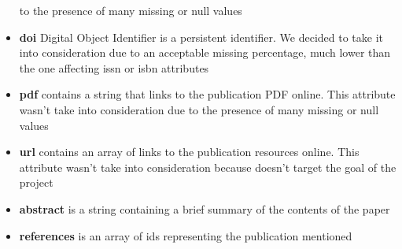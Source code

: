 \documentclass{Configuration_Files/PoliMi3i_thesis}
\begin{document}
\begin{itemize}
            to the presence of many missing or null values
    \item \textbf{doi} Digital Object Identifier is a persistent identifier. We decided to take it into consideration
            due to an acceptable missing percentage, much lower than the one affecting issn or isbn attributes
    \item \textbf{pdf} contains a string that links to the publication PDF online. This attribute wasn't take into
            consideration due to the presence of many missing or null values
    \item \textbf{url} contains an array of links to the publication resources online. This attribute wasn't take into
            consideration because doesn't target the goal of the project
    \item \textbf{abstract} is a string containing a brief summary of the contents of the paper
    \item \textbf{references} is an array of ids representing the publication mentioned
\end{itemize}
\bigskip
\end{document}

